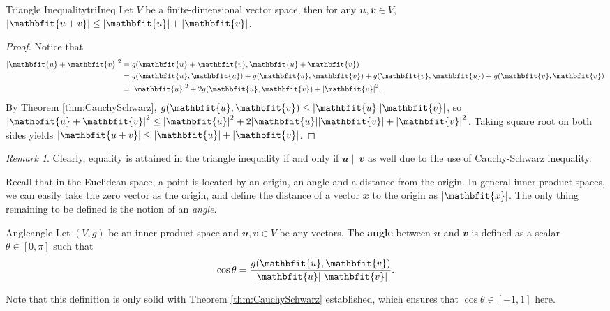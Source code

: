 \documentclass[math, code]{amznotes}
\theoremstyle{remark}
\newtheorem*{remark}{Remark}
\begin{document}
\begin{corbox}{Triangle Inequality}{triIneq}
    Let $V$ be a finite-dimensional vector space, then for any $\mathbfit{u}, \mathbfit{v} \in V$, $\abs{\mathbfit{u + v}} \leq \abs{\mathbfit{u}} + \abs{\mathbfit{v}}$. 
    \tcblower
    \begin{proof}
        Notice that 
        \begin{align*}
            \abs{\mathbfit{u} + \mathbfit{v}}^2 & = g(\mathbfit{u} + \mathbfit{v}, \mathbfit{u} + \mathbfit{v}) \\
            & = g(\mathbfit{u}, \mathbfit{u}) + g(\mathbfit{u}, \mathbfit{v}) + g(\mathbfit{v}, \mathbfit{u}) + g(\mathbfit{v}, \mathbfit{v}) \\
            & = \abs{\mathbfit{u}}^2 + 2g(\mathbfit{u}, \mathbfit{v}) + \abs{\mathbfit{v}}^2.
        \end{align*}
        By Theorem \ref{thm:CauchySchwarz}, $g(\mathbfit{u}, \mathbfit{v}) \leq \abs{\mathbfit{u}}\abs{\mathbfit{v}}$, so $\abs{\mathbfit{u} + \mathbfit{v}}^2 \leq \abs{\mathbfit{u}}^2 + 2\abs{\mathbfit{u}}\abs{\mathbfit{v}} + \abs{\mathbfit{v}}^2$. Taking square root on both sides yields $\abs{\mathbfit{u + v}} \leq \abs{\mathbfit{u}} + \abs{\mathbfit{v}}$.
    \end{proof}
\end{corbox}
\begin{notebox}
    \begin{remark}
        Clearly, equality is attained in the triangle inequality if and only if $\mathbfit{u} \parallel \mathbfit{v}$ as well due to the use of Cauchy-Schwarz inequality.
    \end{remark}
\end{notebox}

Recall that in the Euclidean space, a point is located by an origin, an angle and a distance from the origin. In general inner product spaces, we can easily take the zero vector as the origin, and define the distance of a vector $\mathbfit{x}$ to the origin as $\abs{\mathbfit{x}}$. The only thing remaining to be defined is the notion of an \textit{angle}.
\begin{dfnbox}{Angle}{angle}
    Let $(V, g)$ be an inner product space and $\mathbfit{u}, \mathbfit{v} \in V$ be any vectors. The {\color{red} \textbf{angle}} between $\mathbfit{u}$ and $\mathbfit{v}$ is defined as a scalar $\theta \in [0, \pi]$ such that 
    \begin{equation*}
        \cos\theta = \frac{g(\mathbfit{u}, \mathbfit{v})}{\abs{\mathbfit{u}}\abs{\mathbfit{v}}}.
    \end{equation*}
\end{dfnbox}
Note that this definition is only solid with Theorem \ref{thm:CauchySchwarz} established, which ensures that $\cos\theta \in [-1, 1]$ here.
\end{document}
